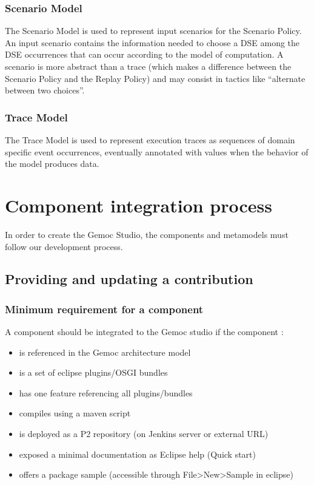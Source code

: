 \documentclass{gemoc} %
\begin{document}

\subsection{Scenario Model}
The Scenario Model is used to represent input scenarios for the Scenario Policy. An input scenario contains the information needed to choose a DSE among the DSE occurrences that can occur according to the model of computation. A scenario is more abstract than a trace (which makes a difference between the Scenario Policy and the Replay Policy) and may consist in tactics like ``alternate between two choices''.

\subsection{Trace Model}
The Trace Model is used to represent execution traces as sequences of domain specific event occurrences, eventually annotated with values when the behavior of the model produces data.


\chapter{Component integration process}
In  order to create the Gemoc Studio, the components and metamodels must follow our development process.

\section{Providing and updating a contribution}
\subsection{Minimum requirement for a component}
A component should be integrated to the Gemoc studio if the component :
\begin{itemize}
	\item is referenced in the Gemoc architecture model
	\item is a set of eclipse plugins/OSGI bundles
	\item has one feature referencing all plugins/bundles
	\item compiles using a maven script
	\item is deployed as a P2 repository (on Jenkins server or external URL)
	\item exposed a minimal documentation as Eclipse help (Quick start)
	\item offers a package sample (accessible through File>New>Sample in eclipse)
\end{itemize}
\end{document}
